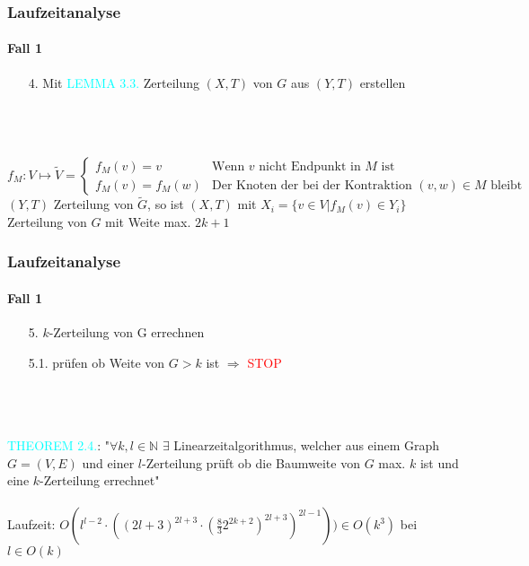 \begin{frame}
\frametitle{Laufzeitanalyse}
\framesubtitle{Fall 1}

\begin{enumerate}
	\item[4.] Mit \textcolor{cyan}{LEMMA 3.3.} Zerteilung $(X,T)$ von $G$ aus $(Y,T)$ erstellen %
\end{enumerate}
\ \\
\ \\
\ \\
$
f_M: V \mapsto \widetilde{V} = \begin{cases} %
			f_M(v) = v &\text{Wenn } v \text{ nicht Endpunkt in } M \text{ ist} \\
			f_M(v) = f_M(w) &\text{Der Knoten der bei der Kontraktion }(v,w) \in M \text{ bleibt }
		\end{cases}
$ \\
$(Y,T)$ Zerteilung von $\widetilde{G}$, so ist $(X,T)$ mit $X_i = \{ v \in V | f_M(v) \in Y_i \}$ Zerteilung von $G$ mit Weite max. $2k+1$
\end{frame}


\begin{frame}
\frametitle{Laufzeitanalyse}
\framesubtitle{Fall 1}

\begin{enumerate}
	\item[5.] $k$-Zerteilung von G errechnen
	\item[5.1.] prüfen ob Weite von $G > k$ ist $\Rightarrow$ \textcolor{red}{STOP}
\end{enumerate}
\ \\
\ \\
\ \\
\textcolor{cyan}{THEOREM 2.4.}: "$\forall k,l \in \mathbb{N}$ $\exists$ Linearzeitalgorithmus, welcher aus einem Graph $G=(V,E)$ und einer $l$-Zerteilung prüft ob die Baumweite von $G$ max. $k$ ist und eine $k$-Zerteilung errechnet" \\
\ \\
Laufzeit: $O(l^{l-2} \cdot ((2l+3)^{2l+3} \cdot (\frac{8}{3} 2^{2k+2})^{2l+3})^{2l-1})) \in O(k^3)$ bei $l \in O(k)$
\end{frame}